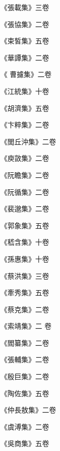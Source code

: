 \begin{pinyinscope}
 《張載集》三卷



 《張協集》二卷



 《束皙集》五卷



 《華譚集》二卷



 《
 曹攄集》二卷



 《江統集》十卷



 《胡濟集》五卷



 《卞粹集》二卷



 《閭丘沖集》二卷



 《庾敳集》二卷



 《阮瞻集》二卷



 《阮循集》二卷



 《裴邈集》二卷



 《郭象集》五卷



 《嵇含集》十卷



 《孫惠集》十卷



 《蔡洪集》三卷



 《牽秀集》五卷



 《蔡克集》二卷



 《索靖集》二
 卷



 《閻纂集》二卷



 《張輔集》二卷



 《殷巨集》二卷



 《陶佐集》五卷



 《仲長敖集》二卷



 《虞溥集》二卷



 《吳商集》五卷




\end{pinyinscope}
